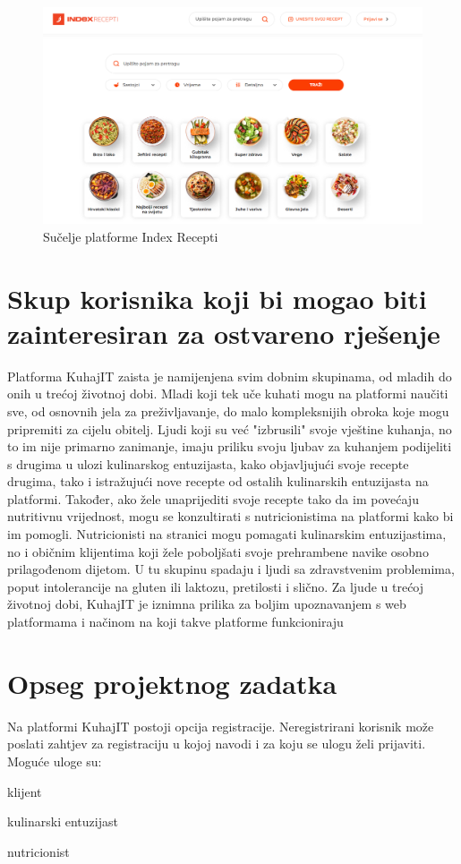 		\begin{figure}[H]
			\includegraphics[scale=0.4]{slike/indexRecepti.PNG} %
			\centering
			\caption{Sučelje platforme Index Recepti}
			\label{indexRecepti}
		\end{figure}
		
		\section{Skup korisnika koji bi mogao biti zainteresiran za ostvareno rješenje}
		
		Platforma KuhajIT zaista je namijenjena svim dobnim skupinama, od mladih do onih u trećoj životnoj dobi. Mladi koji tek uče kuhati mogu na platformi naučiti sve, od osnovnih jela za preživljavanje, do malo kompleksnijih obroka koje mogu pripremiti za cijelu obitelj. Ljudi koji su već "izbrusili" svoje vještine kuhanja, no to im nije primarno zanimanje, imaju priliku svoju ljubav za kuhanjem podijeliti s drugima u ulozi kulinarskog entuzijasta, kako objavljujući svoje recepte drugima, tako i istražujući nove recepte od ostalih kulinarskih entuzijasta na platformi. Također, ako žele unaprijediti svoje recepte tako da im povećaju nutritivnu vrijednost, mogu se konzultirati s nutricionistima na platformi kako bi im pomogli. Nutricionisti na stranici mogu pomagati kulinarskim entuzijastima, no i običnim klijentima koji žele poboljšati svoje prehrambene navike osobno prilagođenom dijetom. U tu skupinu spadaju i ljudi sa zdravstvenim problemima, poput intolerancije na gluten ili laktozu, pretilosti i slično. Za ljude u trećoj životnoj dobi, KuhajIT je iznimna prilika za boljim upoznavanjem s web platformama i načinom na koji takve platforme funkcioniraju
		
		\section{Opseg projektnog zadatka}
		Na platformi KuhajIT postoji opcija registracije.
		Neregistrirani korisnik može poslati zahtjev za registraciju u kojoj navodi i za koju se ulogu želi prijaviti. Moguće uloge su:
		\begin{packed_item}
		    \item klijent
		    \item kulinarski entuzijast
		    \item nutricionist
		\end{packed_item}
		
